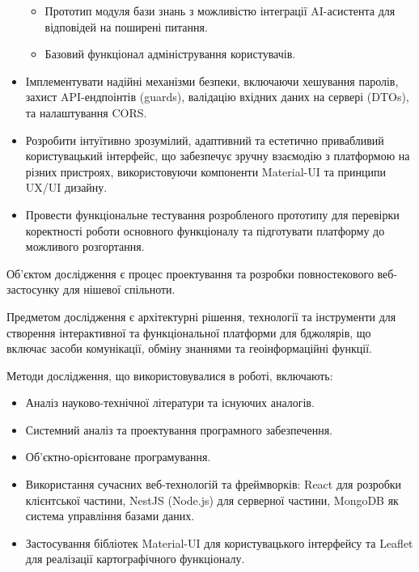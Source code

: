 \begin{itemize}
\begin{itemize}
            \item Прототип модуля бази знань з можливістю інтеграції AI-асистента для відповідей на поширені питання.
            \item Базовий функціонал адміністрування користувачів.
        \end{itemize}
    \item Імплементувати надійні механізми безпеки, включаючи хешування паролів, захист API-ендпоінтів (guards), валідацію вхідних даних на сервері (DTOs), та налаштування CORS.
    \item Розробити інтуїтивно зрозумілий, адаптивний та естетично привабливий користувацький інтерфейс, що забезпечує зручну взаємодію з платформою на різних пристроях, використовуючи компоненти Material-UI та принципи UX/UI дизайну.
    \item Провести функціональне тестування розробленого прототипу для перевірки коректності роботи основного функціоналу та підготувати платформу до можливого розгортання.
\end{itemize}

Об'єктом дослідження є процес проектування та розробки повностекового веб-застосунку для нішевої спільноти.

Предметом дослідження є архітектурні рішення, технології та інструменти для створення інтерактивної та функціональної платформи для бджолярів, що включає засоби комунікації, обміну знаннями та геоінформаційні функції.

Методи дослідження, що використовувалися в роботі, включають:
\begin{itemize}
    \item Аналіз науково-технічної літератури та існуючих аналогів.
    \item Системний аналіз та проектування програмного забезпечення.
    \item Об'єктно-орієнтоване програмування.
    \item Використання сучасних веб-технологій та фреймворків: React для розробки клієнтської частини, NestJS (Node.js) для серверної частини, MongoDB як система управління базами даних.
    \item Застосування бібліотек Material-UI для користувацького інтерфейсу та Leaflet для реалізації картографічного функціоналу.
\end{itemize}

